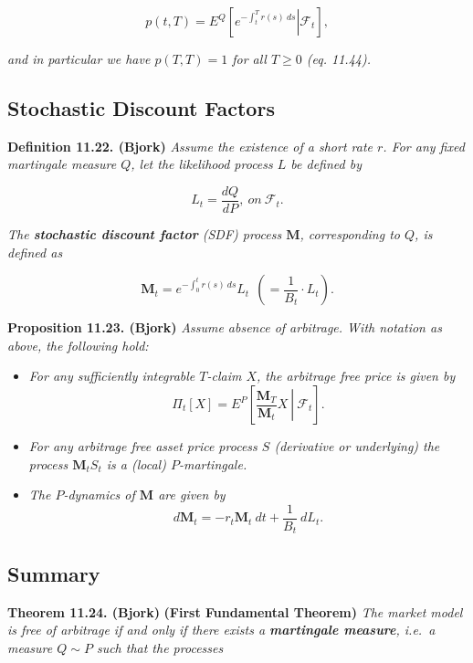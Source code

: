 \documentclass[a4paper,10pt,openany]{book}
\providecommand{\tightlist}{%
 \setlength{\itemsep}{0pt}\setlength{\parskip}{0pt}}
\begin{document}
\[
p(t,T)=E^Q\left[\left.e^{-\int_t^Tr(s)\ ds}\right\vert \mathcal{F}_t\right],\tag{11.43}
\]

\emph{and in particular we have \(p(T,T)=1\) for all \(T\ge 0\) (eq. 11.44).}

\hypertarget{stochastic-discount-factors-1}{%
\subsection{Stochastic Discount Factors}\label{stochastic-discount-factors-1}}

\textbf{Definition 11.22. (Bjork)} \emph{Assume the existence of a short rate \(r\). For any fixed martingale measure \(Q\), let the likelihood process \(L\) be defined by}

\[
L_t=\frac{dQ}{dP},\ on\ \mathcal{F}_t.\tag{11.48}
\]

\emph{The \textbf{stochastic discount factor} (SDF) process \(\mathbf{M}\), corresponding to \(Q\), is defined as}

\[
\mathbf{M}_t=e^{-\int_0^tr(s)\ ds}L_t\ \ \left(=\frac{1}{B_t}\cdot L_t\right).\tag{11.49/50}
\]

\textbf{Proposition 11.23. (Bjork)} \emph{Assume absence of arbitrage. With notation as above, the following hold:}

\begin{itemize}
\tightlist
\item
  \emph{For any sufficiently integrable \(T\)-claim \(X\), the arbitrage free price is given by}
  \[
    \Pi_t[X]=E^P\left[\left. \frac{\mathbf{M}_T}{\mathbf{M}_t} X \ \right\vert\ \mathcal{F}_t\right].\tag{11.51}
    \]
\item
  \emph{For any arbitrage free asset price process \(S\) (derivative or underlying) the process \(\mathbf{M}_tS_t\) is a (local) \(P\)-martingale.}
\item
  \emph{The \(P\)-dynamics of \(\mathbf{M}\) are given by}
  \[
    d\mathbf{M}_t=-r_t\mathbf{M}_t\ dt+\frac{1}{B_t}\ dL_t.\tag{11.53}
    \]
\end{itemize}

\hypertarget{summary}{%
\subsection{Summary}\label{summary}}

\textbf{Theorem 11.24. (Bjork)} \textbf{(First Fundamental Theorem)} \emph{The market model is free of arbitrage if and only if there exists a \textbf{martingale measure}, i.e.~a measure \(Q\sim P\) such that the processes}
\end{document}
